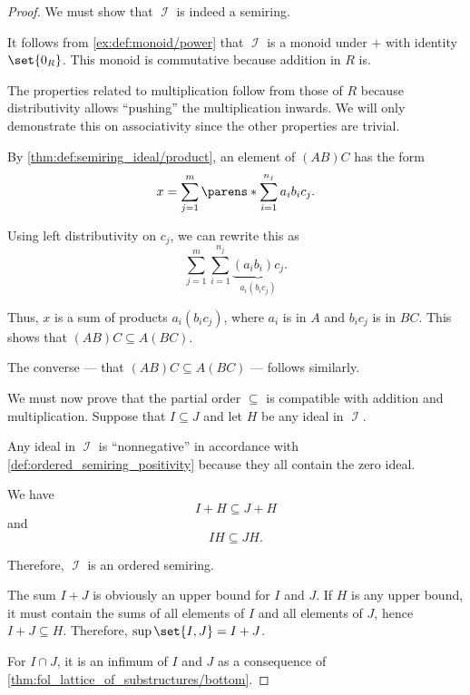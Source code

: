 \begin{proof}
   We must show that \( \mscrI \) is indeed a semiring.

  It follows from \cref{ex:def:monoid/power} that \( \mscrI \) is a monoid under \( + \) with identity \( \set{ 0_R } \). This monoid is commutative because addition in \( R \) is.

  The properties related to multiplication follow from those of \( R \) because distributivity allows \enquote{pushing} the multiplication inwards. We will only demonstrate this on associativity since the other properties are trivial.

   By \cref{thm:def:semiring_ideal/product}, an element of \( (AB)C \) has the form
  \begin{equation*}
    x = \sum_{j=1}^m \parens*{ \sum_{i=1}^{n_j} a_i b_i } c_j.
  \end{equation*}

  Using left distributivity on \( c_j \), we can rewrite this as
  \begin{equation*}
    \sum_{j=1}^m \sum_{i=1}^{n_j} \underbrace{(a_i b_i) c_j}_{a_i (b_i c_j)}.
  \end{equation*}

  Thus, \( x \) is a sum of products \( a_i (b_i c_j) \), where \( a_i \) is in \( A \) and \( b_i c_j \) is in \( BC \). This shows that \( (AB)C \subseteq A(BC) \).

  The converse --- that \( (AB)C \subseteq A(BC) \) --- follows similarly.

   We must now prove that the partial order \( \subseteq \) is compatible with addition and multiplication. Suppose that \( I \subseteq J \) and let \( H \) be any ideal in \( \mscrI \).

  Any ideal in \( \mscrI \) is \enquote{nonnegative} in accordance with \cref{def:ordered_semiring_positivity} because they all contain the zero ideal.

  We have
  \begin{equation*}
    I + H \subseteq J + H
  \end{equation*}
  and
  \begin{equation*}
    IH \subseteq JH.
  \end{equation*}

  Therefore, \( \mscrI \) is an ordered semiring.

   The sum \( I + J \) is obviously an upper bound for \( I \) and \( J \). If \( H \) is any upper bound, it must contain the sums of all elements of \( I \) and all elements of \( J \), hence \( I + J \subseteq H \). Therefore, \( \sup\set{I, J} = I + J \).

  For \( I \cap J \), it is an infimum of \( I \) and \( J \) as a consequence of \cref{thm:fol_lattice_of_substructures/bottom}.
\end{proof}

